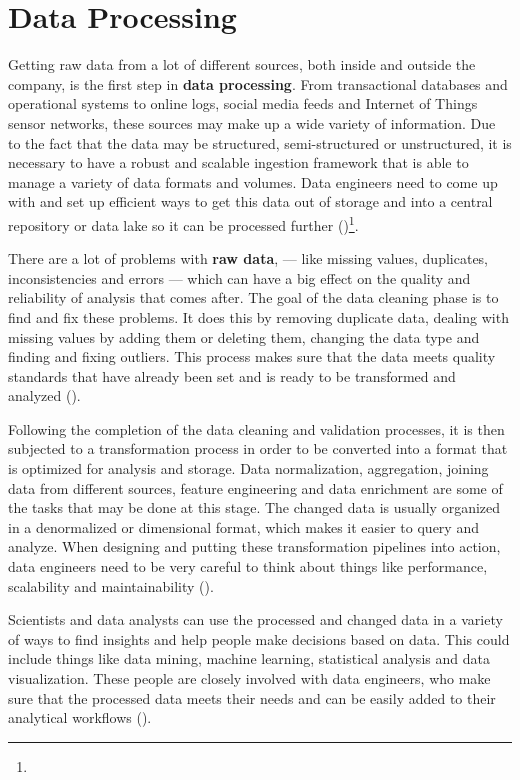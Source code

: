 \section{Data Processing}

Getting raw data from a lot of different sources, both inside and outside the company, is the first step in \textbf{data processing}. From transactional databases and operational systems to online logs, social media feeds and Internet of Things sensor networks, these sources may make up a wide variety of information. Due to the fact that the data may be structured, semi-structured or unstructured, it is necessary to have a robust and scalable ingestion framework that is able to manage a variety of data formats and volumes. Data engineers need to come up with and set up efficient ways to get this data out of storage and into a central repository or data lake so it can be processed further (\cite{tomeDataEngineeringScala2024})\footnote[10]{}.

There are a lot of problems with \textbf{raw data}, — like missing values, duplicates, inconsistencies and errors — which can have a big effect on the quality and reliability of analysis that comes after. The goal of the data cleaning phase is to find and fix these problems. It does this by removing duplicate data, dealing with missing values by adding them or deleting them, changing the data type and finding and fixing outliers. This process makes sure that the data meets quality standards that have already been set and is ready to be transformed and analyzed (\cite{tomeDataEngineeringScala2024})\footnotemark[10].

Following the completion of the data cleaning and validation processes, it is then subjected to a transformation process in order to be converted into a format that is optimized for analysis and storage. Data normalization, aggregation, joining data from different sources, feature engineering and data enrichment are some of the tasks that may be done at this stage. The changed data is usually organized in a denormalized or dimensional format, which makes it easier to query and analyze. When designing and putting these transformation pipelines into action, data engineers need to be very careful to think about things like performance, scalability and maintainability (\cite{tomeDataEngineeringScala2024})\footnotemark[10].

Scientists and data analysts can use the processed and changed data in a variety of ways to find insights and help people make decisions based on data. This could include things like data mining, machine learning, statistical analysis and data visualization. These people are closely involved with data engineers, who make sure that the processed data meets their needs and can be easily added to their analytical workflows (\cite{tomeDataEngineeringScala2024})\footnotemark[10].

